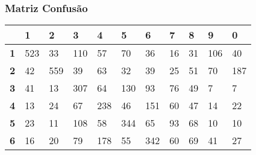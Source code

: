 \documentclass[a4paper]{article}
\begin{document}
\subsubsection{Matriz Confusão}
\begin{table}[H]
    \centering
    \begin{tabular}{|l|l|l|l|l|l|l|l|l|l|l|}
        \hline
                   & \textbf{1}                  & \textbf{2}                  & \textbf{3}                  & \textbf{4}                  & \textbf{5}                  & \textbf{6}                  & \textbf{7}                  & \textbf{8}                  & \textbf{9}                  & \textbf{0}                  \\ \hline
        \textbf{1} & 523                         & 33                          & 110                         & 57                          & 70                          & 36                          & 16                          & 31                          & 106                         & 40                          \\ \hline
        \textbf{2} & 42                          & 559                         & 39                          & 63                          & 32                          & 39                          & 25                          & 51                          & 70                          & 187                         \\ \hline
        \textbf{3} & 41                          & 13                          & 307                         & 64                          & 130                         & 93                          & 76                          & 49                          & 7                           & 7                           \\ \hline
        \textbf{4} & 13                          & 24                          & 67                          & 238                         & 46                          & 151                         & 60                          & 47                          & 14                          & 22                          \\ \hline
        \textbf{5} & 23                          & 11                          & 108                         & 58                          & 344                         & 65                          & 93                          & 68                          & 10                          & 10                          \\ \hline
        \textbf{6} & 16                          & 20                          & 79                          & 178                         & 55                          & 342                         & 60                          & 69                          & 41                          & 27                          \\ \hline

\end{tabular}
\end{table}
\end{document}

